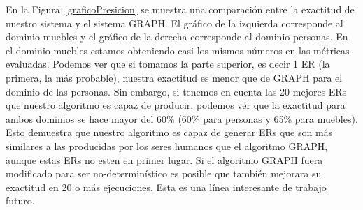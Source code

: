 En la Figura~\ref{graficoPresicion} se muestra una comparaci\'on entre la exactitud de nuestro sistema y el sistema GRAPH. El gr\'afico de la izquierda corresponde al dominio muebles y el gr\'afico de la derecha corresponde al dominio personas. En el dominio muebles estamos obteniendo casi los mismos n\'umeros en las m\'etricas evaluadas.
Podemos ver que si tomamos la parte superior, es decir 1 ER (la primera, la m\'as probable), nuestra exactitud es menor que de GRAPH para el dominio de las personas. Sin embargo, si tenemos en cuenta las 20 mejores ERs que nuestro algoritmo es capaz de producir, podemos ver que la exactitud para ambos dominios se hace mayor del 60\% (60\% para personas y 65\% para muebles). Esto demuestra que nuestro algoritmo es capaz de generar ERs que son m\'as similares a las producidas por los seres humanos que el algoritmo GRAPH, aunque estas ERs no esten en primer lugar. Si el algoritmo GRAPH fuera modificado para ser no-determin\'istico es posible que tambi\'en mejorara su exactitud en 20 o m\'as ejecuciones. Esta es una l\'inea interesante de trabajo futuro. 

